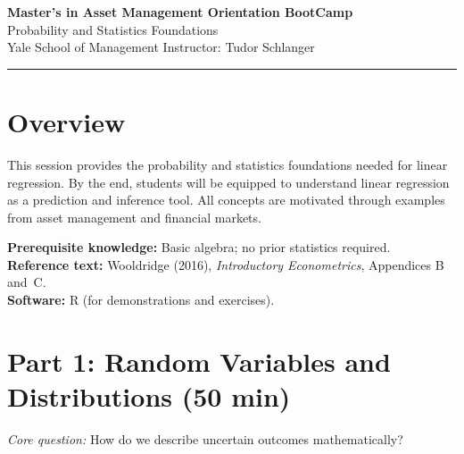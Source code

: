\documentclass[letterpaper,10pt]{article}
\begin{document}
\begin{center}
{\Large\bfseries Master's in Asset Management Orientation BootCamp}\\[0.5em]
{\large Probability and Statistics Foundations}\\[0.5em]
{\normalsize Yale School of Management \hspace{1cm} Instructor: Tudor Schlanger}
\end{center}

\vspace{0.5em}
\hrule
\vspace{1em}

\section*{Overview}

This session provides the probability and statistics foundations needed for linear regression. By the end, students will be equipped to understand linear regression as a prediction and inference tool. All concepts are motivated through examples from asset management and financial markets.

\medskip

\noindent\textbf{Prerequisite knowledge:} Basic algebra; no prior statistics required.\\
\textbf{Reference text:} Wooldridge (2016), \textit{Introductory Econometrics}, Appendices B and~C.\\
\textbf{Software:} R (for demonstrations and exercises).

\vspace{1em}

\section*{Part 1: Random Variables and Distributions \hfill \normalsize\textnormal{(50 min)}}

\noindent\textit{Core question:} How do we describe uncertain outcomes mathematically?
\end{document}
